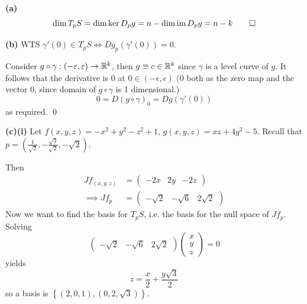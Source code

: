 \documentclass[a4paper, 12pt]{article}
\begin{document}
\begin{solution}
    \textbf{(a)} \[
    \dim T_p S = \dim \ker D_p g = n - \dim \operatorname*{\mathrm{im}} D_p g = n - k \qed
    \]

    \textbf{(b)} WTS $\gamma'(0) \in T_p S \Leftrightarrow Dg_p (\gamma'(0)) = 0$.

    Consider $g \circ \gamma: (-\varepsilon, \varepsilon) \to \mathbb{R}^k$, then $g \equiv c \in \mathbb{R}^k$ since $\gamma$ is a level curve of $g$. It follows that the derivative is 0 at $0 \in (-\epsilon, \epsilon)$ (0 both as the zero map and the vector 0, since domain of $g \circ \gamma$ is 1 dimensional.)
    \[
    0 = D(g \circ \gamma)_0 = Dg(\gamma'(0))
    \]
    as required. \qed

    \textbf{(c)(i)} Let $f(x, y, z) = -x^2 + y^2 - z^2 + 1$, $g(x, y, z) = xz + 4y^2 - 5$. Recall that $p = (\frac{1}{\sqrt{2}}, - \frac{\sqrt{3}}{\sqrt{2}},  -\sqrt{2})$.

    Then \begin{align*}
    Jf_{(x, y, z)} &= \begin{pmatrix}
        -2x & 2y & -2z
    \end{pmatrix} \\
    \implies Jf_{p} &= \begin{pmatrix}
        -\sqrt{2} & - \sqrt{6} & 2 \sqrt{2}
    \end{pmatrix}
    \end{align*}
    Now we want to find the basis for $T_p S$, i.e. the basis for the null space of $Jf_p$. Solving \[
        \begin{pmatrix}
            -\sqrt{2} & - \sqrt{6} & 2 \sqrt{2}
        \end{pmatrix}
        \begin{pmatrix}
        x \\
        y \\
        z
        \end{pmatrix} = 0
    \]
    yields \[
        z = \frac{x}{2} + \frac{y\sqrt{3}}{2}
    \]
    so a basis is $\left\{(2, 0, 1), (0, 2, \sqrt{3})\right\}$.


\end{solution}
\end{document}
